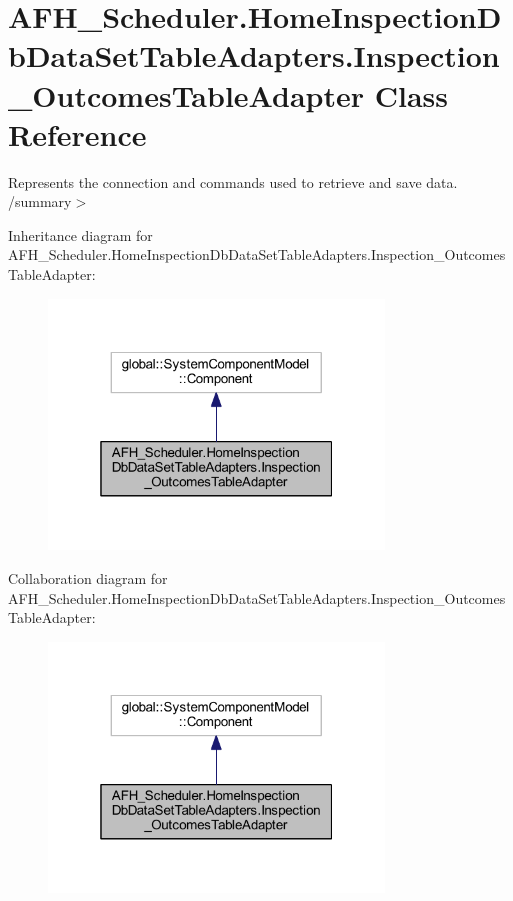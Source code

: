 \section{A\+F\+H\+\_\+\+Scheduler.\+Home\+Inspection\+Db\+Data\+Set\+Table\+Adapters.\+Inspection\+\_\+\+Outcomes\+Table\+Adapter Class Reference}
\label{class_a_f_h___scheduler_1_1_home_inspection_db_data_set_table_adapters_1_1_inspection___outcomes_table_adapter}


Represents the connection and commands used to retrieve and save data. /summary$>$  




Inheritance diagram for A\+F\+H\+\_\+\+Scheduler.\+Home\+Inspection\+Db\+Data\+Set\+Table\+Adapters.\+Inspection\+\_\+\+Outcomes\+Table\+Adapter\+:
\nopagebreak
\begin{figure}[H]
\begin{center}
\leavevmode
\includegraphics[width=253pt]{class_a_f_h___scheduler_1_1_home_inspection_db_data_set_table_adapters_1_1_inspection___outcomes_table_adapter__inherit__graph}
\end{center}
\end{figure}


Collaboration diagram for A\+F\+H\+\_\+\+Scheduler.\+Home\+Inspection\+Db\+Data\+Set\+Table\+Adapters.\+Inspection\+\_\+\+Outcomes\+Table\+Adapter\+:
\nopagebreak
\begin{figure}[H]
\begin{center}
\leavevmode
\includegraphics[width=253pt]{class_a_f_h___scheduler_1_1_home_inspection_db_data_set_table_adapters_1_1_inspection___outcomes_table_adapter__coll__graph}
\end{center}
\end{figure}
